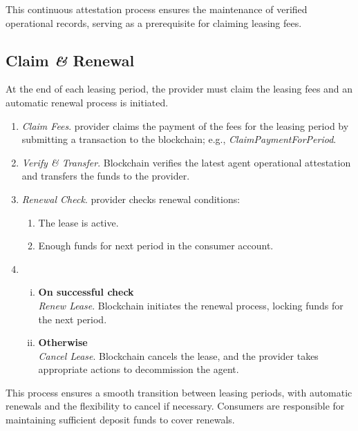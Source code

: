 \documentclass{oc}
\begin{document}
This continuous attestation process ensures the maintenance of verified operational records, serving as a prerequisite for claiming leasing fees.

\subsection{Claim \textit{\&} Renewal}\label{sec:claim-renewal}

At the end of each leasing period, the \gls{provider} must claim the leasing fees and an automatic renewal process is initiated.
\begin{enumerate}
    \item \emph{Claim Fees}. \Gls{provider} claims the payment of the fees for the leasing period by submitting a transaction to the blockchain; e.g., \textit{ClaimPaymentForPeriod}.
    \item \emph{Verify \& Transfer}. Blockchain verifies the latest \gls{agent} operational attestation and transfers the funds to the \gls{provider}.
    \item \emph{Renewal Check}. \Gls{provider} checks renewal conditions:
      \begin{enumerate}
        \item The lease is active.
        \item Enough funds for next period in the \gls{consumer} account.
      \end{enumerate}
    \item
      \begin{enumerate}[(i)]
        \item \textbf{On successful check} \\
          \emph{Renew Lease}. Blockchain initiates the renewal process, locking funds for the next period.
        \item \textbf{Otherwise} \\
          \emph{Cancel Lease}. Blockchain cancels the lease, and the \gls{provider} takes appropriate actions to decommission the \gls{agent}.
      \end{enumerate}
\end{enumerate}

This process ensures a smooth transition between leasing periods, with automatic renewals and the flexibility to cancel if necessary.
Consumers are responsible for maintaining sufficient deposit funds to cover renewals.

\clearpage

\printglossary


\end{document}

